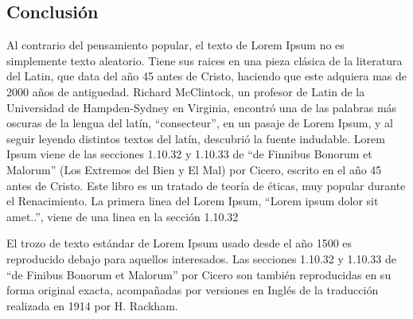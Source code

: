 \documentclass[final,narroweqnarray,inline]{ieee}
\begin{document}

    \subsection{Conclusión}


Al contrario del pensamiento popular, el texto de Lorem Ipsum no es simplemente texto aleatorio. Tiene sus raices en una pieza clásica de la literatura del Latin, que data del año 45 antes de Cristo, haciendo que este adquiera mas de 2000 años de antiguedad. Richard McClintock, un profesor de Latin de la Universidad de Hampden-Sydney en Virginia, encontró una de las palabras más oscuras de la lengua del latín, ``consecteur'', en un pasaje de Lorem Ipsum, y al seguir leyendo distintos textos del latín, descubrió la fuente indudable. Lorem Ipsum viene de las secciones 1.10.32 y 1.10.33 de ``de Finnibus Bonorum et Malorum'' (Los Extremos del Bien y El Mal) por Cicero, escrito en el año 45 antes de Cristo. Este libro es un tratado de teoría de éticas, muy popular durante el Renacimiento. La primera linea del Lorem Ipsum, ``Lorem ipsum dolor sit amet..'', viene de una linea en la sección 1.10.32

El trozo de texto estándar de Lorem Ipsum usado desde el año 1500 es reproducido debajo para aquellos interesados. Las secciones 1.10.32 y 1.10.33 de ``de Finibus Bonorum et Malorum'' por Cicero son también reproducidas en su forma original exacta, acompañadas por versiones en Inglés de la traducción realizada en 1914 por H. Rackham.
\end{document}
